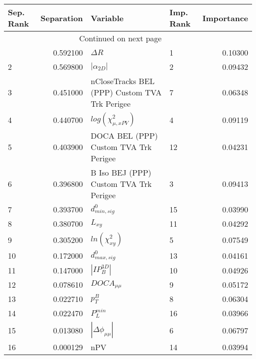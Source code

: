 \usepackage{lscape}

\begin{landscape}
\begin{longtable}{lrllr}
\toprule
Sep. Rank &  Separation &                                       Variable & Imp. Rank &  Importance \\
\midrule
\endhead
\midrule
\multicolumn{3}{r}{{Continued on next page}} \\
\midrule
\endfoot

\bottomrule
\endlastfoot
        1 &    0.592100 &                                     $\Delta R$ &         1 &     0.10300 \\
        2 &    0.569800 &                                $|\alpha_{2D}|$ &         2 &     0.09432 \\
        3 &    0.451000 &  nCloseTracks BEL (PPP) Custom TVA Trk Perigee &         7 &     0.06348 \\
        4 &    0.440700 &                      $log(\chi^{2}_{\mu,xPV})$ &         4 &     0.09119 \\
        5 &    0.403900 &          DOCA BEL (PPP) Custom TVA Trk Perigee &        12 &     0.04231 \\
        6 &    0.396800 &         B Iso BEJ (PPP) Custom TVA Trk Perigee &         3 &     0.09413 \\
        7 &    0.393700 &                               $d^0_{min, sig}$ &        15 &     0.03990 \\
        8 &    0.380700 &                                       $L_{xy}$ &        11 &     0.04292 \\
        9 &    0.305200 &                            $ln(\chi^{2}_{xy})$ &         5 &     0.07549 \\
       10 &    0.172000 &                               $d^0_{max, sig}$ &        13 &     0.04161 \\
       11 &    0.147000 &                                $|IP_{B}^{3D}|$ &        10 &     0.04926 \\
       12 &    0.078610 &                                $DOCA_{\mu\mu}$ &         9 &     0.05172 \\
       13 &    0.022710 &                                      $p^B_{T}$ &         8 &     0.06304 \\
       14 &    0.022470 &                                  $P^{min}_{L}$ &        16 &     0.03966 \\
       15 &    0.013080 &                       $|\Delta \phi_{\mu\mu}|$ &         6 &     0.06797 \\
       16 &    0.000129 &                                            nPV &        14 &     0.03994 \\
\end{longtable}

\end{landscape}
